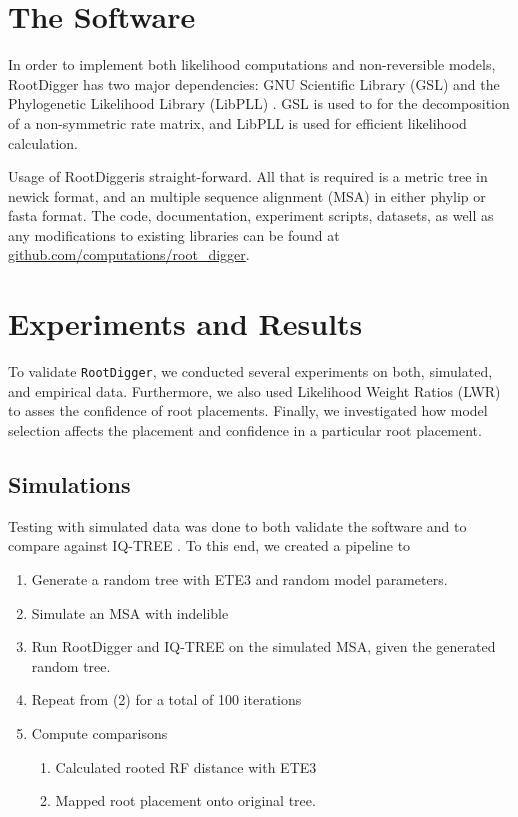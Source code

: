 \documentclass{article}
\newcommand{\RootDigger}{RootDigger}
\newcommand{\RootDiggertt}{\texttt{RootDigger}}
\begin{document}
\section{The Software}

In order to implement both likelihood computations and non-reversible models,
\RootDigger{} has two major dependencies: GNU Scientific Library (GSL)
\cite{gough_gnu_2009} and the Phylogenetic Likelihood Library (LibPLL)
\cite{flouri_phylogenetic_2015}.
GSL is used to for the decomposition of a non-symmetric rate matrix, and LibPLL
is used for efficient likelihood calculation.

Usage of \RootDigger is straight-forward.
All that is required is a metric tree in newick format, and an multiple
sequence alignment (MSA) in either phylip or fasta format.
The code, documentation, experiment scripts, datasets, as well as any
modifications to existing libraries can be found at
\url{github.com/computations/root_digger}.

\section{Experiments and Results}

To validate \RootDiggertt{}, we conducted several experiments on both,
simulated, and empirical data.
Furthermore, we also used Likelihood Weight Ratios (LWR)
\cite{strimmer_inferring_2002} to asses the confidence of root placements.
Finally, we investigated how model selection affects the placement and
confidence in a particular root placement.

\subsection{Simulations}

Testing with simulated data was done to both validate the software and to
compare against IQ-TREE \cite{nguyen_iq-tree:_2015}.
To this end, we created a pipeline to

\begin{enumerate} 
  \item Generate a random tree with ETE3
        \cite{huerta-cepas_ete_2016} and random model parameters.
  \item Simulate an MSA with indelible \cite{fletcher_indelible:_2009}
  \item Run RootDigger and IQ-TREE \cite{nguyen_iq-tree:_2015} on the simulated
        MSA, given the generated random tree.
    \item Repeat from (2) for a total of 100 iterations
  \item Compute comparisons
        \begin{enumerate}
          \item Calculated rooted RF distance with ETE3
                \cite{robinson_comparison_1981}
          \item Mapped root placement onto original tree.
        \end{enumerate}
\end{enumerate}
\end{document}
